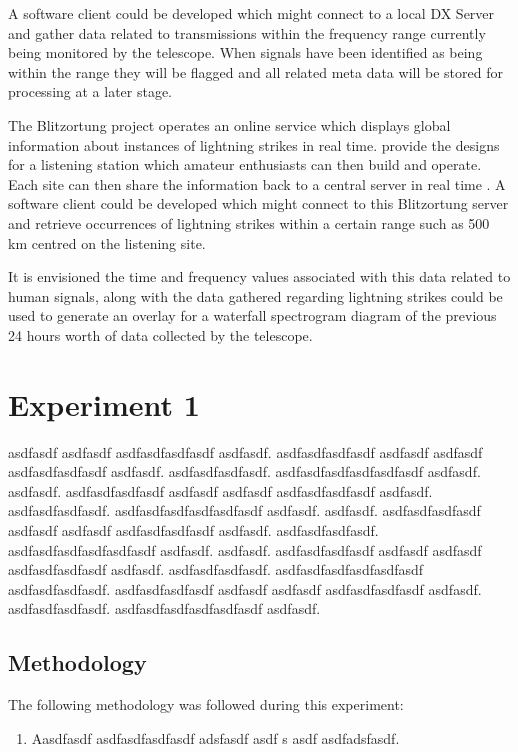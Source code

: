 \documentclass[runningheads,a4paper]{llncs}
\begin{document}
A software client could be developed which might connect to a local DX Server and gather data related to transmissions within the frequency range currently being monitored by the telescope. When signals have been identified as being within the range they will be flagged and all related meta data will be stored for processing at a later stage.

The Blitzortung project operates an online service which displays global information about instances of lightning strikes in real time. \cite{blitzortung-14} provide the designs for a listening station which amateur enthusiasts can then build and operate. Each site can then share the information back to a central server in real time \citep{blitzortung-14}. A software client could be developed which might connect to this Blitzortung server and retrieve occurrences of lightning strikes within a certain range such as 500 km centred on the listening site.

It is envisioned the time and frequency values associated with this data related to human signals, along with the data gathered regarding lightning strikes could be used to generate an overlay for a waterfall spectrogram diagram of the previous 24 hours worth of data collected by the telescope.


\section*{Experiment 1}
asdfasdf asdfasdf asdfasdfasdfasdf asdfasdf. asdfasdfasdfasdf asdfasdf asdfasdf asdfasdfasdfasdf asdfasdf. asdfasdfasdfasdf. asdfasdfasdfasdfasdfasdf asdfasdf. asdfasdf. asdfasdfasdfasdf asdfasdf asdfasdf asdfasdfasdfasdf asdfasdf. asdfasdfasdfasdf. asdfasdfasdfasdfasdfasdf asdfasdf. asdfasdf. asdfasdfasdfasdf asdfasdf asdfasdf asdfasdfasdfasdf asdfasdf. asdfasdfasdfasdf. asdfasdfasdfasdfasdfasdf asdfasdf. asdfasdf. asdfasdfasdfasdf asdfasdf asdfasdf asdfasdfasdfasdf asdfasdf. asdfasdfasdfasdf. asdfasdfasdfasdfasdfasdf asdfasdfasdfasdf. asdfasdfasdfasdf asdfasdf asdfasdf asdfasdfasdfasdf asdfasdf. asdfasdfasdfasdf. asdfasdfasdfasdfasdfasdf asdfasdf.


\subsection*{Methodology}
The following methodology was followed during this experiment:

\begin{enumerate}
	\item Aasdfasdf asdfasdfasdfasdf adsfasdf asdf s asdf  asdfadsfasdf. 
\end{enumerate}
\end{document}
